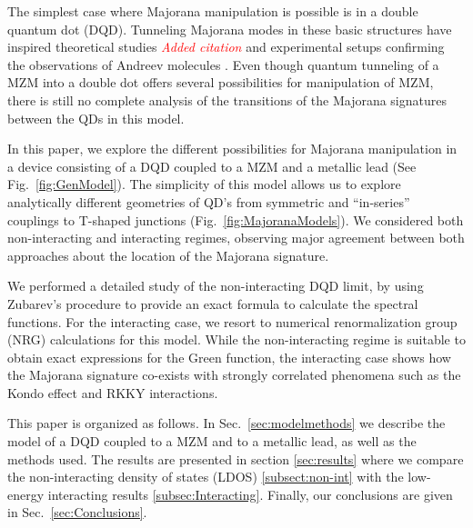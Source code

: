 \documentclass[showpacs,aps,prb,reprint,superscriptaddress]{revtex4-2}
\newcommand{\Jesus}[1]{\textcolor{red}{\fbox{Jesus} {\sl#1}}}
\begin{document}


 The simplest case where Majorana manipulation is possible is in a double quantum dot (DQD). Tunneling Majorana modes in these basic structures have inspired theoretical studies \cite{silva_andreev_2016,ivanov_coherent_2017,Loss2019} \Jesus{Added citation} and experimental setups confirming the observations of Andreev molecules \cite{su_andreev_2017}. Even though quantum tunneling of a MZM into a double dot offers several possibilities for manipulation of MZM,  there is still no complete analysis of the transitions of the Majorana signatures between the QDs in this model. 
 
 
 In this paper, we explore the different possibilities for Majorana manipulation in a device consisting of a DQD coupled to a MZM and a metallic lead (See Fig.\ \ref{fig:GenModel}). The simplicity of this model allows us to explore analytically different geometries of QD's from symmetric and ``in-series'' couplings to T-shaped junctions (Fig.\ \ref{fig:MajoranaModels}). We considered both non-interacting and interacting regimes, observing major agreement between both approaches about the location of the Majorana signature.
 
 We performed a detailed study of the non-interacting DQD limit, by using Zubarev's procedure  \cite{zubarev_double-time_1960} to provide an exact formula to calculate the spectral functions. For the interacting case, we resort to numerical renormalization group (NRG)\cite{bulla_numerical_2008} calculations for this model.
 While the non-interacting regime is suitable to obtain exact expressions for the Green function, the interacting case  shows how the Majorana signature co-exists with strongly correlated phenomena such as the Kondo effect \cite{hewson_kondo_1997} and RKKY interactions.   \cite{ruderman_indirect_1954,kasuya_theory_1956,yosida_magnetic_1957} 


This paper is organized as follows. In Sec.\ \ref{sec:modelmethods} we describe the model of a DQD coupled to a MZM and to a metallic lead, as well as the methods used.  The results are presented in section \ref{sec:results} where we compare the non-interacting density of states (LDOS) \ref{subsect:non-int} with the low-energy  interacting results \ref{subsec:Interacting}. Finally, our conclusions are given in Sec.\ \ref{sec:Conclusions}.
\end{document}
